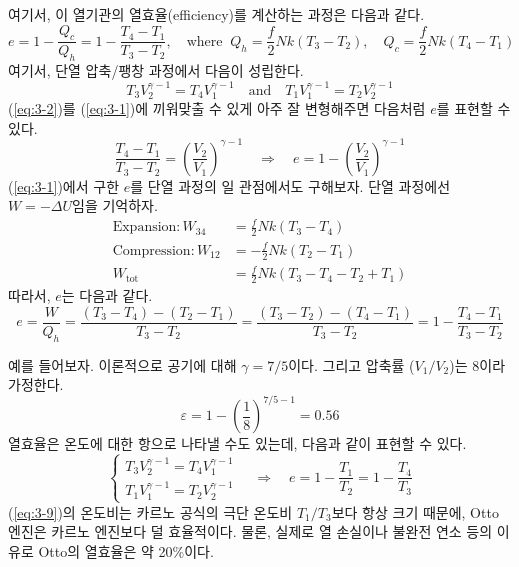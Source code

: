 \documentclass{article}
\newcommand{\ve}{\varepsilon}
\begin{document}
\noindent
여기서, 이 열기관의 열효율(efficiency)를 계산하는 과정은 다음과 같다.
\begin{equation}\label{eq:3-1}
    e = 1-\frac{Q_c}{Q_h} =1 - \frac{T_4 - T_1}{T_3 - T_2}, \quad \text{where } \ Q_h = \frac{f}{2} Nk(T_3 - T_2), \quad Q_c = \frac{f}{2} Nk(T_4 - T_1)
\end{equation}
여기서, 단열 압축/팽창 과정에서 다음이 성립한다.
\begin{equation}\label{eq:3-2}
    T_3 V_2^{\gamma -1} = T_4 V_1^{\gamma -1} \quad \text{and} \quad T_1 V_1^{\gamma -1} = T_2 V_2^{\gamma -1}
\end{equation}
(\ref{eq:3-2})를 (\ref{eq:3-1})에 끼워맞출 수 있게 아주 잘 변형해주면 다음처럼 $e$를 표현할 수 있다.
\begin{equation}
    \frac{T_4 - T_1}{T_3 - T_2} = \left( \frac{V_2}{V_1} \right)^{\gamma -1} \quad \Rightarrow \quad \boxed{ e = 1 - \left( \frac{V_2}{V_1} \right)^{\gamma -1}}
\end{equation}
(\ref{eq:3-1})에서 구한 $e$를 단열 과정의 일 관점에서도 구해보자. 단열 과정에선 $W = -\Delta U$임을 기억하자.
\begin{align}
    \text{Expansion} : W_{34} &= \frac{f}{2}Nk (T_3 - T_4)\\
    \text{Compression} : W_{12} &= -\frac{f}{2} Nk (T_2 - T_1)\\
    W_\text{tot} &= \frac{f}{2} Nk (T_3 - T_4 - T_2 + T_1)
\end{align}
따라서, $e$는 다음과 같다.
\begin{equation}
    e = \frac{W}{Q_h} = \frac{(T_3 - T_4) - (T_2 -  T_1)}{T_3 - T_2} = \frac{(T_3 - T_2) - (T_4 - T_1)}{T_3 - T_2} = 1 - \frac{T_4 - T_1}{T_3 - T_2}
\end{equation}

\newpage

예를 들어보자. 이론적으로 공기에 대해 $\gamma = 7/5$이다. 그리고 압축률 ($V_1/V_2$)는 8이라 가정한다.
\begin{equation}
    \ve = 1 - \left( \frac{1}{8} \right)^{7/5 - 1} = 0.56
\end{equation}
열효율은 온도에 대한 항으로 나타낼 수도 있는데, 다음과 같이 표현할 수 있다.
\begin{equation}\label{eq:3-9}
    \begin{cases}
        T_3 V_2^{\gamma -1} = T_4 V_1^{\gamma -1}\\
        T_1 V_1^{\gamma -1} = T_2 V_2^{\gamma -1}
    \end{cases} \quad \Rightarrow \quad e = 1 - \frac{T_1}{T_2} = 1- \frac{T_4}{T_3}
\end{equation}
(\ref{eq:3-9})의 온도비는 카르노 공식의 극단 온도비 $T_1 / T_3$보다 항상 크기 때문에, Otto 엔진은 카르노 엔진보다 덜 효율적이다. 물론, 실제로 열 손실이나 불완전 연소 등의 이유로 Otto의 열효율은 약 20\%이다.
\end{document}
